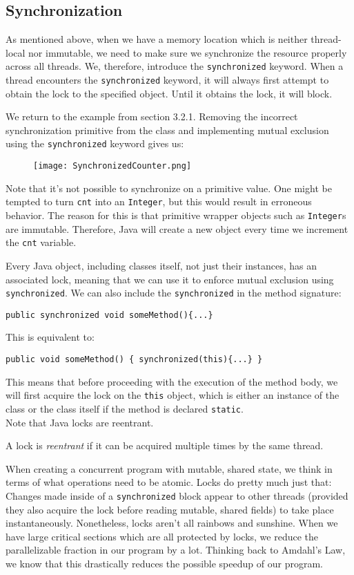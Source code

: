 \documentclass[main]{subfiles}
\begin{document}
\subsection{Synchronization}
As mentioned above, when we have a memory location which is neither thread-local nor immutable, we need to make sure we synchronize the resource properly across all threads. We, therefore, introduce the \texttt{synchronized} keyword. When a thread encounters the \texttt{synchronized} keyword, it will always first attempt to obtain the lock to the specified object. Until it obtains the lock, it will block.
\begin{example}
    We return to the example from section 3.2.1. Removing the incorrect synchronization primitive from the class and implementing mutual exclusion using the \texttt{synchronized} keyword gives us:
    \begin{figure}[H]
        \centering
        \texttt{[image: SynchronizedCounter.png]}
    \end{figure}
    \noindent Note that it's not possible to synchronize on a primitive value. One might be tempted to turn \texttt{cnt} into an \texttt{Integer}, but this would result in erroneous behavior. The reason for this is that primitive wrapper objects such as \texttt{Integer}s are immutable. Therefore, Java will create a new object every time we increment the \texttt{cnt} variable.
\end{example}
Every Java object, including classes itself, not just their instances, has an associated lock, meaning that we can use it to enforce mutual exclusion using \texttt{synchronized}. We can also include the \texttt{synchronized} in the method signature:
\begin{center}
    \texttt{public synchronized void someMethod()\{...\}}
\end{center}
This is equivalent to:
\begin{center}
    \texttt{public void someMethod() \{\ synchronized(this)\{...\}\ \}}
\end{center}
This means that before proceeding with the execution of the method body, we will first acquire the lock on the \texttt{this} object, which is either an instance of the class or the class itself if the method is declared \texttt{static}.\\[3mm]
Note that Java locks are reentrant.
\begin{definition}
    A lock is \textit{reentrant} if it can be acquired multiple times by the same thread.
\end{definition}
When creating a concurrent program with mutable, shared state, we think in terms of what operations need to be atomic. Locks do pretty much just that: Changes made inside of a \texttt{synchronized} block appear to other threads (provided they also acquire the lock before reading mutable, shared fields) to take place instantaneously. Nonetheless, locks aren't all rainbows and sunshine. When we have large critical sections which are all protected by locks, we reduce the parallelizable fraction in our program by a lot. Thinking back to Amdahl's Law, we know that this drastically reduces the possible speedup of our program.
\end{document}

